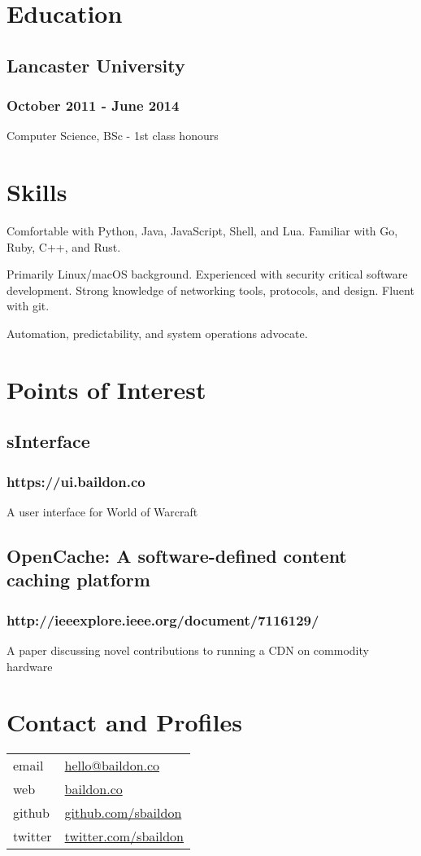 \documentclass[a4paper,11pt]{article}
\begin{document}
\begin{multicols*}{2}
\section*{Education}
\subsection*{Lancaster University}
\subsubsection*{October 2011 - June 2014}
Computer Science, BSc - 1st class honours\par

\section*{Skills}
Comfortable with Python, Java, JavaScript, Shell, and Lua. Familiar with Go, Ruby, C++, and Rust.\medskip

Primarily Linux/macOS background. Experienced with security critical software development. Strong knowledge of networking tools, protocols, and design.  Fluent with git.\medskip

Automation, predictability, and system operations advocate.

\section*{Points of Interest}
\subsection*{sInterface}
\subsubsection*{https://ui.baildon.co}
A user interface for World of Warcraft
\subsection*{OpenCache: A software-defined content caching platform}
\subsubsection*{http://ieeexplore.ieee.org/document/7116129/}
A paper discussing novel contributions to running a CDN on commodity hardware

\section*{Contact and Profiles}
\noindent \begin{tabular}{@{}ll}
email & \href{mailto:hello@baildon.co}{hello@baildon.co} \\
web & \href{https://baildon.co}{baildon.co} \\
github & \href{https://github.com/sbaildon}{github.com/sbaildon} \\
twitter & \href{https://twitter.com/sbaildon}{twitter.com/sbaildon}
\end{tabular}

\end{multicols*}
\end{document}

